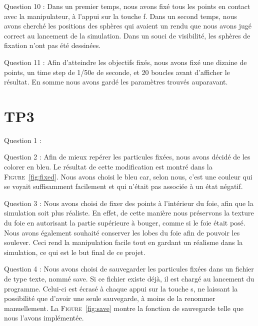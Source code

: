 \documentclass[a4paper,12pt]{article}
\begin{document}
Question 10 : Dans un premier temps, nous avons fixé tous les points en contact avec la manipulateur, à l'appui sur la touche \og{}f\fg{}. Dans un second temps, nous avons cherché les positions des sphères qui avaient un rendu que nous avons jugé correct au lancement de la simulation. Dans un souci de visibilité, les sphères \og{}de fixation\fg{} n'ont pas été dessinées.


Question 11 : Afin d'atteindre les objectifs fixés, nous avons fixé une dizaine de points, un time step de 1/50e de seconde, et 20 boucles avant d'afficher le résultat. En somme nous avons gardé les paramètres trouvés auparavant.

\section{TP3}

Question 1 :

Question 2 : Afin de mieux repérer les particules fixées, nous avons décidé de les colorer en bleu. Le résultat de cette modification est montré dans la \textsc{Figure}~\ref{fig:fixed}. Nous avons choisi le bleu car, selon nous, c'est une couleur qui se voyait suffisamment facilement et qui n'était pas associée à un état négatif.

Question 3 : Nous avons choisi de fixer des points à l'intérieur du foie, afin que la simulation soit plus réaliste. En effet, de cette manière nous préservons la \og{}texture\fg{} du foie en autorisant la partie supérieure à bouger, comme si le foie était posé. Nous avons également souhaité conserver les lobes du foie afin de pouvoir les soulever. Ceci rend la manipulation facile tout en gardant un réalisme dans la simulation, ce qui est le but final de ce projet.

Question 4 : Nous avons choisi de sauvegarder les particules fixées dans un fichier de type texte, nommé \og{}save\fg{}. Si ce fichier existe déjà, il est chargé au lancement du programme. Celui-ci est écrasé à chaque appui sur la touche \og{}s\fg{}, ne laissant la possibilité que d'avoir une seule sauvegarde, à moins de la renommer manuellement. La \textsc{Figure}~\ref{fig:save} montre la fonction de sauvegarde telle que nous l'avons implémentée. 
\end{document}
